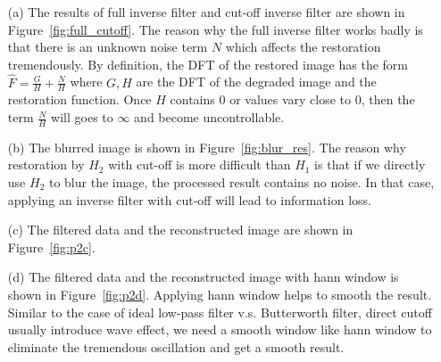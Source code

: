 \documentclass[11pt,letterpaper]{article}
\begin{document}
\begin{itemize}
	\item [(a)] The results of full inverse filter and cut-off inverse filter are shown in Figure~\ref{fig:full_cutoff}.
				The reason why the full inverse filter works badly is that there is an unknown noise term $N$ which affects the restoration tremendously.
				By definition, the DFT of the restored image has the form $\hat{F} = \frac{G}{H}+\frac{N}{H}$ where $G,H$ are the DFT of 
				the degraded image and the restoration function. Once $H$ contains $0$ or values vary close to $0$, then
				the term $\frac{N}{H}$ will goes to $\infty$ and become uncontrollable.
	\item [(b)] The blurred image is shown in Figure~\ref{fig:blur_res}. The reason why restoration by $H_2$ with cut-off 
				is more difficult than $H_1$ is that if we directly use $H_2$ to blur the image, the processed result contains
				no noise. In that case, applying an inverse filter with cut-off will lead to information loss.
	\item [(c)] The filtered data and the reconstructed image are shown in Figure~\ref{fig:p2c}.
	\item [(d)] The filtered data and the reconstructed image with hann window is shown in Figure~\ref{fig:p2d}. Applying hann window 
				helps to smooth the result. Similar to the case of ideal low-pass filter v.s. Butterworth filter, direct cutoff usually 
				introduce wave effect, we need a smooth window like hann window to eliminate the tremendous oscillation and get a smooth result.
\end{itemize}
\end{document}
